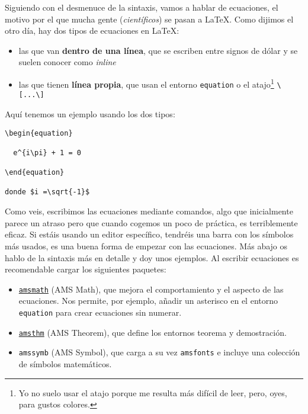 Siguiendo con el desmenuce de la sintaxis, vamos a hablar de ecuaciones,
el motivo por el que mucha gente (\emph{científicos}) se pasan a LaTeX.
Como dijimos el otro día, hay dos tipos de ecuaciones en LaTeX:

\begin{itemize}
\item
  las que van \textbf{dentro de una línea}, que se escriben entre signos
  de dólar y se suelen conocer como \emph{inline}
\item
  las que tienen \textbf{línea propia}, que usan el entorno
  \lstinline!equation! o el atajo\footnote{Yo no suelo usar el atajo
    porque me resulta más difícil de leer, pero, oyes, para gustos
    colores.} \lstinline!\[...\]!
\end{itemize}

Aquí tenemos un ejemplo usando los dos tipos:

\begin{lstlisting}[language={[latex]tex}]
\begin{equation}

  e^{i\pi} + 1 = 0

\end{equation}

donde $i =\sqrt{-1}$
\end{lstlisting}

Como veis, escribimos las ecuaciones mediante comandos, algo que
inicialmente parece un atraso pero que cuando cogemos un poco de
práctica, es terriblemente eficaz. Si estáis usando un editor
específico, tendréis una barra con los símbolos más usados, es una buena
forma de empezar con las ecuaciones. Más abajo os hablo de la sintaxis
más en detalle y doy unos ejemplos. Al escribir ecuaciones es
recomendable cargar los siguientes paquetes:

\begin{itemize}
\item
  \href{https://www.ctan.org/pkg/amsmath}{\lstinline!amsmath!} (AMS
  Math), que mejora el comportamiento y el aspecto de las ecuaciones.
  Nos permite, por ejemplo, añadir un asterisco en el entorno
  \lstinline!equation! para crear ecuaciones sin numerar.
\item
  \href{https://www.ctan.org/pkg/amsthm}{\lstinline!amsthm!} (AMS
  Theorem), que define los entornos teorema y demostración.
\item
  \lstinline!amssymb! (AMS Symbol), que carga a su vez
  \lstinline!amsfonts! e incluye una colección de símbolos matemáticos.
\end{itemize}

